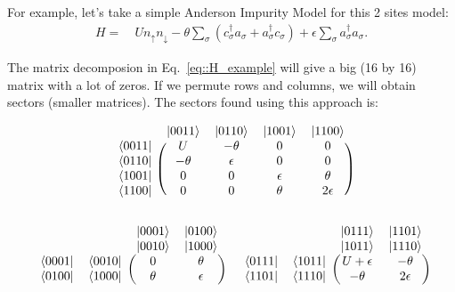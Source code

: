 \documentclass[10pt,letter]{article}
\begin{document}
For example, let's take a simple Anderson Impurity Model for this 2 sites model:
\begin{align}\label{AIM1}
H =&~U n_{\uparrow }n_{\downarrow}
- \theta \sum_{\sigma} (c_{\sigma }^{\dag}a_{\sigma} + a_{\sigma}^{\dag}c_{\sigma}
) 
+ \epsilon \sum_{\sigma} a_{\sigma }^{\dag}a_{\sigma}.
\end{align}

The matrix decomposion in Eq.~\eqref{eq::H_example} will give a big (16 by 16) matrix with a lot of zeros. If we permute rows and columns, we will obtain sectors (smaller matrices). The sectors found using this approach is:

\begin{align}
\begin{blockarray}{ccccc}
& \ket{0011} & \ket{0110} & \ket{1001} & \ket{1100} \\
\begin{block}{c(cccc)}
\bra{0011} & U       & -\theta & 0 & 0\\
\bra{0110} & -\theta & \epsilon & 0 & 0\\
\bra{1001} & 0 & 0 & \epsilon & \theta\\
\bra{1100} & 0 & 0 & \theta & 2\epsilon\\
\end{block}
\end{blockarray}
\end{align}

\begin{align}
\begin{blockarray}{cccc}
& & \ket{0001} & \ket{0100} \\ 
& & \ket{0010} & \ket{1000} \\
\begin{block}{cc(cc)}
\bra{0001}& \bra{0010} & 0 & \theta \\
\bra{0100}& \bra{1000} & \theta & \epsilon\\
\end{block}
\end{blockarray}
&&
\begin{blockarray}{cccc}
& & \ket{0111} & \ket{1101} \\ 
& & \ket{1011} & \ket{1110} \\
\begin{block}{cc(cc)}
\bra{0111}& \bra{1011} & U +\epsilon & -\theta \\
\bra{1101}& \bra{1110} & -\theta & 2\epsilon\\
\end{block}
\end{blockarray}
\end{align}
\end{document}
